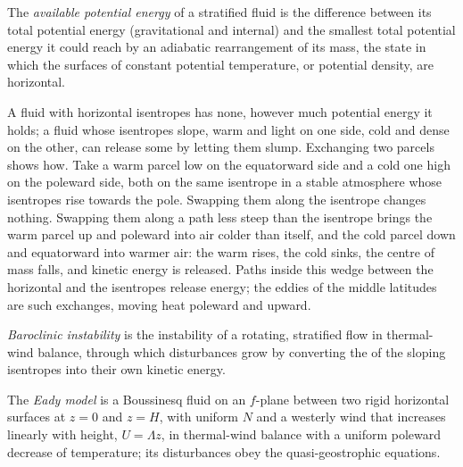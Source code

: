 \begin{definition}\label{def:b3:atmospheric-dynamics:ape}
The \emph{available potential energy} of
a stratified fluid is the difference between its total potential energy
(gravitational and internal) and the smallest total potential energy it
could reach by an adiabatic rearrangement of its mass, the state in which
the surfaces of constant potential temperature, or potential density, are
horizontal.
\end{definition}

A fluid with horizontal isentropes has none, however much potential energy
it holds; a fluid whose isentropes slope, warm and light on one side, cold
and dense on the other, can release some by letting them slump. Exchanging
two parcels shows how. Take a warm parcel low on the equatorward side and a
cold one high on the poleward side, both on the same isentrope in a stable
atmosphere whose isentropes rise towards the pole. Swapping them along the
isentrope changes nothing. Swapping them along a path less steep than the
isentrope brings the warm parcel up and poleward into air colder than
itself, and the cold parcel down and equatorward into warmer air: the warm
rises, the cold sinks, the centre of mass falls, and kinetic energy is
released. Paths inside this wedge between the horizontal and the
isentropes release energy; the eddies of the middle latitudes are such
exchanges, moving heat poleward and upward.

\begin{definition}\label{def:b3:atmospheric-dynamics:baroclinic-instability}
\emph{Baroclinic instability} is the
instability of a rotating, stratified flow in thermal-wind balance, through
which disturbances grow by converting the  of the
sloping isentropes into their own kinetic energy.
\end{definition}

\begin{definition}\label{def:b3:atmospheric-dynamics:eady}
The \emph{Eady model} is a Boussinesq fluid on an
$f$-plane between two rigid horizontal surfaces at $z = 0$ and $z = H$, with
uniform  $N$ and a westerly wind that increases linearly
with height, $U = \Lambda z$, in thermal-wind balance with a uniform
poleward decrease of temperature; its disturbances obey the
quasi-geostrophic equations.
\end{definition}

